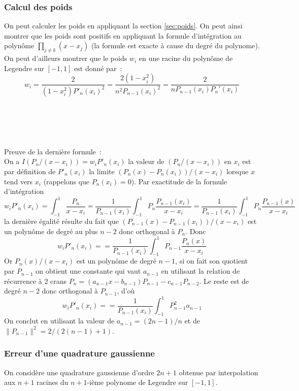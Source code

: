 \documentclass[a4paper,11pt]{article}
\begin{document}
\begin{giacjshere}
\subsubsection{Calcul des poids}
On peut calculer les poids en appliquant
la section \ref{sec:poids}. On peut ainsi montrer
que les poids sont positifs en appliquant la formule
d'int\'egration au polyn\^ome
$\prod_{j\neq k}(x-x_j)$
(la formule est exacte \`a cause du degr\'e du polynome).
On peut d'ailleurs montrer que le poids $w_i$ 
en une racine du polyn\^ome de Legendre
sur $[-1,1]$ est donn\'e par~:
$$ w_i=\frac{2}{(1-x_i^2)P'_n(x_i)^2} = \frac{2(1-x_i^2)}{n^2P_{n-1}(x_i)^2}=\frac{2}{nP_{n-1}(x_i)P_n'(x_i)}$$
\\
\\
\\
\\
\\
Preuve de la derni\`ere formule~:\\
On a $I(P_n/(x-x_i))=w_i P'_n(x_i)$ la valeur de $(P_n/(x-x_i))$
en $x_i$ est par d\'efinition de $P'_n(x_i)$ la limite $(P_n(x)-P_n(x_i))/(x-x_i)$
lorsque $x$ tend vers $x_i$ (rappelons que $P_n(x_i)=0$).
Par exactitude de la formule d'int\'egration
$$w_i P'_n(x_i)=\int_{-1}^1 \frac{P_n}{x-x_i} =
\frac1{P_{n-1}(x_i)}\int_{-1}^1 P_n \frac{P_{n-1}(x_i)}{x-x_i} 
= \frac1{P_{n-1}(x_i)}\int_{-1}^1 P_n \frac{P_{n-1}(x)}{x-x_i} $$
la derni\`ere \'egalit\'e r\'esulte du fait que
$(P_{n-1}(x)-P_{n-1}(x_i))/(x-x_i)$
est un polyn\^ome de degr\'e au plus $n-2$ donc orthogonal \`a $P_n$.
Donc
$$w_i P'_n(x_i)=
= \frac1{P_{n-1}(x_i)}\int_{-1}^1 P_{n-1} \frac{P_n(x)}{x-x_i} $$
Or $P_n(x)/(x-x_i)$ est un polyn\^ome de degr\'e $n-1$, si on fait son
quotient par $P_{n-1}$ on obtient une constante qui vaut $a_{n-1}$ en
utilisant la relation de r\'ecurrence \`a 2 crans
$P_n=(a_{n-1}x-b_{n-1})P_{n-1}-c_{n-1}P_{n-2}$. Le reste est de
degr\'e $n-2$ donc orthogonal \`a $P_{n-1}$, d'o\`u
$$w_i P'_n(x_i)=
= \frac1{P_{n-1}(x_i)}\int_{-1}^1 P_{n-1}^2 a_{n-1} $$
On conclut en utilisant la valeur de $a_{n-1}=(2n-1)/n$ et de
$\| P_{n-1}\|^2=2/(2(n-1)+1)$.

\subsubsection{Erreur d'une quadrature gaussienne}
On consid\`ere une quadrature gaussienne d'ordre $2n+1$ obtenue
par interpolation aux $n+1$ racines du $n+1$-i\`eme polynome de
Legendre sur $[-1,1]$.


\end{giacjshere}
\end{document}
